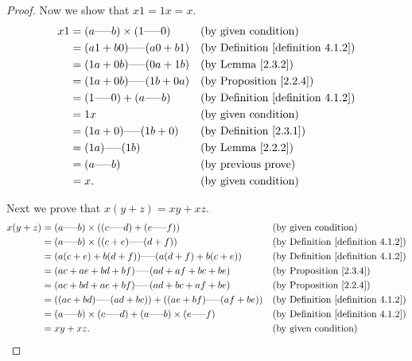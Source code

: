 \begin{proof}
Now we show that \(x1 = 1x = x\).
\begin{align*}
x1 &= (a \text{-----} b) \times (1 \text{-----} 0) && \text{(by given condition)} \\
&= (a1 + b0) \text{-----} (a0 + b1) && \text{(by Definition \ref{definition 4.1.2})} \\
&= (1a + 0b) \text{-----} (0a + 1b) && \text{(by Lemma \ref{2.3.2})} \\
&= (1a + 0b) \text{-----} (1b + 0a) && \text{(by Proposition \ref{2.2.4})} \\
&= (1 \text{-----} 0) + (a \text{-----} b) && \text{(by Definition \ref{definition 4.1.2})} \\
&= 1x && \text{(by given condition)} \\
&= (1a + 0) \text{-----} (1b + 0) && \text{(by Definition \ref{2.3.1})} \\
&= (1a) \text{-----} (1b) && \text{(by Lemma \ref{2.2.2})} \\
&= (a \text{-----} b) && \text{(by previous prove)} \\
&= x. && \text{(by given condition)}
\end{align*}

Next we prove that \(x(y + z) = xy + xz\).
\begin{align*}
x(y + z) &= (a \text{-----} b) \times ((c \text{-----} d) + (e \text{-----} f)) && \text{(by given condition)} \\
&= (a \text{-----} b) \times ((c + e) \text{-----} (d + f)) && \text{(by Definition \ref{definition 4.1.2})} \\
&= (a(c + e) + b(d + f)) \text{-----} (a(d + f) + b(c + e)) && \text{(by Definition \ref{definition 4.1.2})} \\
&= (ac + ae + bd + bf) \text{-----} (ad + af + bc + be) && \text{(by Proposition \ref{2.3.4})} \\
&= (ac + bd + ae + bf) \text{-----} (ad + bc + af + be) && \text{(by Proposition \ref{2.2.4})} \\
&= ((ac + bd) \text{-----} (ad + bc)) + ((ae + bf) \text{-----} (af + be)) && \text{(by Definition \ref{definition 4.1.2})} \\
&= (a \text{-----} b) \times (c \text{-----} d) + (a \text{-----} b) \times (e \text{-----} f) && \text{(by Definition \ref{definition 4.1.2})} \\
&= xy + xz. && \text{(by given condition)}
\end{align*}


\end{proof}
